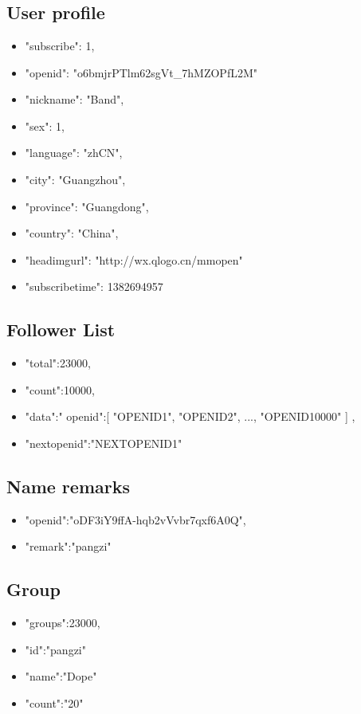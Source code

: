 \documentclass{article}
\begin{document}
\section{}
\subsection{User profile}
\begin{itemize}
	\item "subscribe": 1, 
	\item "openid": "o6bmjrPTlm62sgVt\_7hMZOPfL2M"
	\item "nickname": "Band", 
	\item "sex": 1, 
	\item "language": "zhCN", 
	\item "city": "Guangzhou", 
	\item "province": "Guangdong", 
	\item "country": "China", 
	\item "headimgurl":    "http://wx.qlogo.cn/mmopen"
	\item "subscribetime": 1382694957
\end{itemize}

\subsection{Follower List}
\begin{itemize}
	\item "total":23000,
	\item "count":10000,
	\item "data":{"
     openid":[
        "OPENID1",
        "OPENID2",
        ...,
        "OPENID10000"
     ]
   },
	\item  "nextopenid":"NEXTOPENID1"
\end{itemize}


\subsection{Name remarks}
\begin{itemize}
	\item "openid":"oDF3iY9ffA-hqb2vVvbr7qxf6A0Q",
	\item "remark":"pangzi"
\end{itemize}

\subsection{Group}
\begin{itemize}
	\item "groups":23000,
	\item "id":"pangzi"
	\item "name":"Dope"
	\item "count":"20"
\end{itemize}
\end{document}
